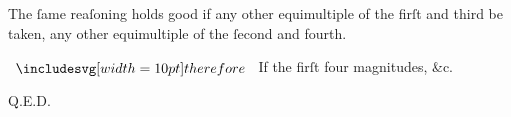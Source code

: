 \documentclass[12pt,preview]{standalone}
\begin{document}
\begin{minipage}{\textwidth}
    \hfill

    The ſame reaſoning holds good if any other equimultiple of the firſt and third be taken, any other equimultiple of the ſecond and fourth.

    \hfill

    \begin{center}
        $\btherefore$ If the firſt four magnitudes, \&c.
    \end{center}

    \hfill

    \hfill Q.E.D.
\end{minipage}%
\end{document}

